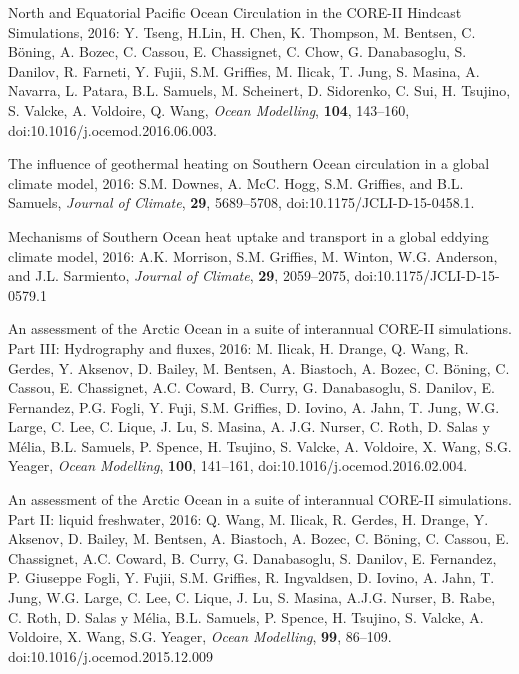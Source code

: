 \begin{etaremune}
\item North and Equatorial Pacific Ocean Circulation in the CORE-II
  Hindcast Simulations, 2016: Y. Tseng, H.Lin, H. Chen, K.  Thompson,
  M. Bentsen, C. B\"{o}ning, A. Bozec, C. Cassou, E.  Chassignet,
  C. Chow, G. Danabasoglu, S. Danilov, R. Farneti, Y. Fujii, S.M. Grif\/f\/ies, M. Ilicak, T. Jung, S. Masina, A. Navarra,
  L. Patara, B.L.  Samuels, M. Scheinert, D. Sidorenko, C. Sui,
  H. Tsujino, S. Valcke, A. Voldoire, Q. Wang, {\it Ocean Modelling},
  {\bf 104}, 143--160, doi:10.1016/j.ocemod.2016.06.003.

\item The influence of geothermal heating on Southern Ocean
  circulation in a global climate model, 2016: S.M. Downes,
  A. McC. Hogg, S.M. Grif\/f\/ies, and B.L. Samuels, {\it
    Journal of Climate}, {\bf 29}, 5689--5708,
  doi:10.1175/JCLI-D-15-0458.1.

\item Mechanisms of Southern Ocean heat uptake and transport in a global eddying climate model, 2016: A.K. Morrison, S.M. Grif\/f\/ies, M. Winton, W.G. Anderson, and J.L. Sarmiento,
  {\it Journal of Climate}, {\bf 29}, 2059--2075, doi:10.1175/JCLI-D-15-0579.1

\item An assessment of the Arctic Ocean in a suite of interannual
  CORE-II simulations. Part III: Hydrography and fluxes, 2016:
  M. Ilicak, H. Drange, Q. Wang, R. Gerdes, Y. Aksenov, D. Bailey,
  M. Bentsen, A. Biastoch, A. Bozec, C. B\"{o}ning, C. Cassou,
  E. Chassignet, A.C. Coward, B. Curry, G. Danabasoglu, S. Danilov,
  E. Fernandez, P.G. Fogli, Y. Fuji, S.M. Grif\/f\/ies,
  D. Iovino, A. Jahn, T. Jung, W.G. Large, C. Lee, C. Lique, J. Lu,
  S. Masina, A. J.G. Nurser, C. Roth, D. Salas y M\'{e}lia,
  B.L. Samuels, P. Spence, H. Tsujino, S. Valcke, A. Voldoire,
  X. Wang, S.G. Yeager, {\it Ocean Modelling}, {\bf 100}, 141--161,
  doi:10.1016/j.ocemod.2016.02.004.

\item An assessment of the Arctic Ocean in a suite of interannual
  CORE-II simulations. Part II: liquid freshwater, 2016: Q. Wang,
  M. Ilicak, R. Gerdes, H. Drange, Y. Aksenov, D. Bailey, M. Bentsen,
  A. Biastoch, A. Bozec, C. B\"{o}ning, C.  Cassou, E. Chassignet,
  A.C. Coward, B. Curry, G. Danabasoglu, S. Danilov, E. Fernandez,
  P. Giuseppe Fogli, Y. Fujii, S.M. Grif\/f\/ies, R. Ingvaldsen,
  D. Iovino, A. Jahn, T. Jung, W.G. Large, C. Lee, C. Lique, J. Lu,
  S. Masina, A.J.G. Nurser, B. Rabe, C. Roth, D. Salas y M\'elia,
  B.L. Samuels, P. Spence, H. Tsujino, S. Valcke, A. Voldoire,
  X. Wang, S.G. Yeager, {\it Ocean Modelling}, {\bf 99}, 86--109.  doi:10.1016/j.ocemod.2015.12.009


\end{etaremune}
